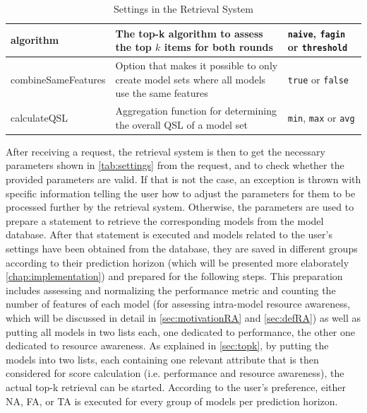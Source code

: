 \begin{table}[htbp]
\begin{tabular}{  l  p{7cm}  p{3cm} }
  algorithm & The top-k algorithm to assess the top $k$ items for both rounds & \texttt{naive}, \texttt{fagin} or \texttt{threshold} \\\hline
  combineSameFeatures & Option that makes it possible to only create model sets where all models use the same features & \texttt{true} or \texttt{false} \\\hline
  calculateQSL & Aggregation function for determining the overall QSL of a model set & \texttt{min}, \texttt{max} or \texttt{avg} \\
          \bottomrule
      \end{tabular}
  \caption{Settings in the Retrieval System} \label{tab:settings}
  \end{table}
  
After receiving a request, the retrieval system is then to get the necessary parameters shown in \autoref{tab:settings} from the request, and to check whether the provided parameters are valid. If that is not the case, an exception is thrown with specific information telling the user how to adjust the parameters for them to be processed further by the retrieval system. Otherwise, the parameters are used to prepare a statement to retrieve the corresponding models from the model database. After that statement is executed and models related to the user's settings have been obtained from the database, they are saved in different groups according to their prediction horizon (which will be presented more elaborately \autoref{chap:implementation}) and prepared for the following steps. This preparation includes assessing and normalizing the performance metric and counting the number of features of each model (for assessing intra-model resource awareness, which will be discussed in detail in \autoref{sec:motivationRA} and \autoref{sec:defRA}) as well as putting all models in two lists each, one dedicated to performance, the other one dedicated to resource awareness. As explained in \autoref{sec:topk}, by putting the models into two lists, each containing one relevant attribute that is then considered for score calculation (i.e. performance and resource awareness), the actual top-k retrieval can be started. According to the user's preference, either NA, FA, or TA is executed for every group of models per prediction horizon.

